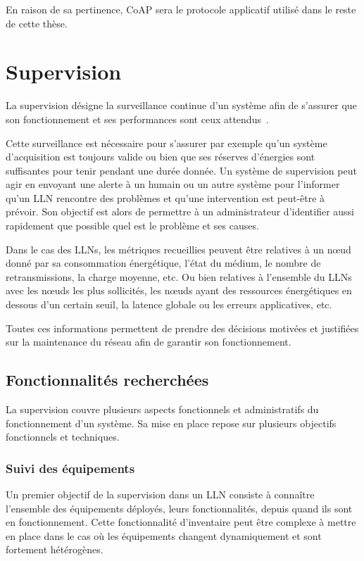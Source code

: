 En raison de sa pertinence, \ac{CoAP} sera le protocole applicatif utilisé dans le reste de cette thèse.

\section{Supervision}
\label{gw:supervision}

La supervision désigne la surveillance continue d'un système afin de s'assurer que son fonctionnement et ses performances sont ceux attendus~\cite{ligus2012effective}.

Cette surveillance est nécessaire pour s'assurer par exemple qu'un système d'acquisition est toujours valide ou bien que ses réserves d'énergies sont suffisantes pour tenir pendant une durée donnée.
Un système de supervision peut agir en envoyant une alerte à un humain ou un autre système pour l'informer qu'un \ac{LLN} rencontre des problèmes et qu'une intervention est peut-être à prévoir.
Son objectif est alors de permettre à un administrateur d'identifier aussi rapidement que possible quel est le problème et ses causes.

Dans le cas des \ac{LLN}s, les métriques recueillies peuvent être relatives à un nœud donné par sa consommation énergétique, l'état du médium, le nombre de retransmissions, la charge moyenne, etc.
Ou bien relatives à l'ensemble du \ac{LLN}s avec les nœuds les plus sollicités, les nœuds ayant des ressources énergétiques en dessous d'un certain seuil, la latence globale ou les erreurs applicatives, etc.

Toutes ces informations permettent de prendre des décisions motivées et justifiées sur la maintenance du réseau afin de garantir son fonctionnement.

\subsection{Fonctionnalités recherchées}

La supervision couvre plusieurs aspects fonctionnels et administratifs du fonctionnement d'un système.
Sa mise en place repose sur plusieurs objectifs fonctionnels et techniques.

\subsubsection{Suivi des équipements}

Un premier objectif de la supervision dans un \ac{LLN} consiste à connaître l'ensemble des équipements déployés, leurs fonctionnalités, depuis quand ils sont en fonctionnement.
Cette fonctionnalité d'inventaire peut être complexe à mettre en place dans le cas où les équipements changent dynamiquement et sont fortement hétérogènes.

